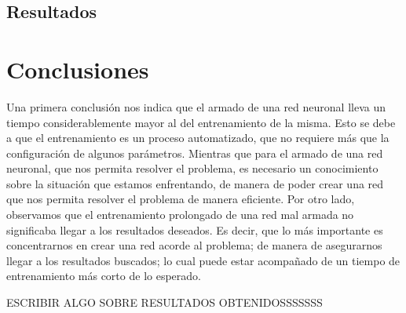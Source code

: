 \documentclass[12pt,titlepage]{article}
\begin{document}
\subsection{Resultados}

\pagebreak
\section{Conclusiones}
Una primera conclusi\'on nos indica que el armado de una red neuronal lleva un tiempo considerablemente mayor al del entrenamiento de la misma. Esto se debe a que el entrenamiento es un proceso automatizado, que no requiere m\'as que la conﬁguraci\'on de algunos par\'ametros. Mientras que para el armado de una red neuronal, que nos permita resolver el problema, es necesario un conocimiento sobre la situaci\'on que
estamos enfrentando, de manera de poder crear una red que nos permita resolver el problema de manera eﬁciente. Por otro lado, observamos que el entrenamiento prolongado de una red mal armada no signiﬁcaba llegar a los resultados deseados. Es decir, que lo m\'as importante es concentrarnos en crear una red acorde al problema; de manera de asegurarnos llegar a los resultados buscados; lo cual puede estar acompa\~nado de un tiempo de entrenamiento m\'as corto de lo esperado.


ESCRIBIR ALGO SOBRE RESULTADOS OBTENIDOSSSSSSS



\end{document}

